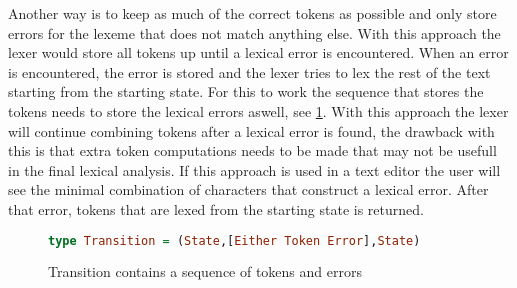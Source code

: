Another way is to keep as much of the correct tokens as possible and only store
errors for the lexeme that does not match anything else. With this approach the
lexer would store all tokens up until a lexical error is encountered. When an
error is encountered, the error is stored and the lexer tries to lex the rest of
the text starting from the starting state. For this to work the sequence that
stores the tokens needs to store the lexical errors aswell, see
\cref{fig:error2}. With this approach the lexer will continue combining tokens
after a lexical error is found, the drawback with this is that extra
token computations needs to be made that may not be usefull in the final lexical
analysis. If this approach is used in a text editor the user will see the minimal
combination of characters that construct a lexical error. After that error,
tokens that are lexed from the starting state is returned.

\begin{figure}[!ht]
  \begin{lstlisting}[language=Haskell]
    type Transition = (State,[Either Token Error],State)
  \end{lstlisting}
  \caption{Transition contains a sequence of tokens and errors\label{fig:error2}}
\end{figure}

\newpage

